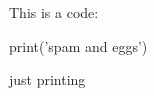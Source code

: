 \documentclass[a4paper,10pt]{article}
\begin{document}
This is a code:
\begin{pyverbatim}
print('spam and eggs')
\end{pyverbatim}

 just printing 
\end{document}
